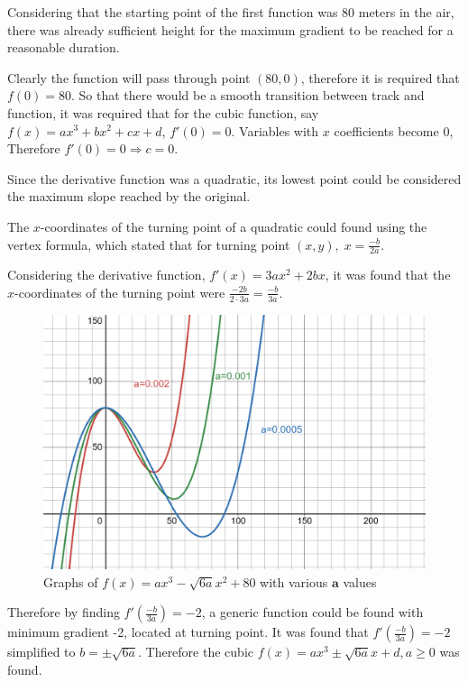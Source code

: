 \documentclass[11pt, letterpaper]{article}
\begin{document}
Considering that the starting point of the first function was 80 meters in the air, there was already sufficient height for the maximum gradient to be reached for a reasonable duration.

Clearly the function will pass through point $(80, 0)$, therefore it is required that $f(0)=80$. So that there would be a smooth transition between track and function, it was required that for the cubic function, say $f(x)=ax^3 +bx^2 +cx +d$, $f'(0)=0$. Variables with $x$ coefficients become 0, Therefore $f'(0)=0\Rightarrow c=0$.

Since the derivative function was a quadratic, its lowest point could be considered the maximum slope reached by the original.

The $x$-coordinates of the turning point of a quadratic could found using the vertex formula, which stated that for turning point $(x, y),\; x=\frac{-b}{2a}$.

Considering the derivative function, $f'(x)=3ax^2+2bx$, it was found that the $x$-coordinates of the turning point were $\frac{-2b}{2\cdot3a}=\frac{-b}{3a}$.



\begin{figure}[h!]
	\centering
	\includegraphics[width=15cm]{Eaxmple Cubic.png}
	\caption{Graphs of $f(x)=ax^{3}-\sqrt{6a}x^{2}+80$ with various $\mathbf{a}$ values}
\end{figure}


Therefore by finding $f'(\frac{-b}{3a})=-2$, a generic function could be found with minimum gradient -2, located at turning point. It was found that $f'(\frac{-b}{3a})=-2$ simplified to $b=\pm\sqrt{6a}$. Therefore the cubic $f(x)=ax^3\pm\sqrt{6a}x+d, a\geq0$ was found. 
\end{document}
